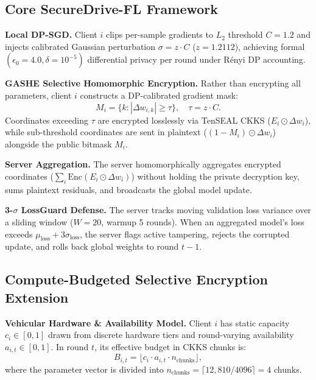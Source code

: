 \documentclass[acmtog,nonacm]{acmart}
\begin{document}
\subsection{Core SecureDrive-FL Framework}
\label{subsec:securedrive-fl}

\textbf{Local DP-SGD.} Client $i$ clips per-sample gradients to $L_2$ threshold $C = 1.2$ and injects calibrated Gaussian perturbation $\sigma = z \cdot C$ ($z = 1.2112$), achieving formal $(\epsilon_0 = 4.0, \delta = 10^{-5})$ differential privacy per round under Rényi DP accounting.

\textbf{GASHE Selective Homomorphic Encryption.} Rather than encrypting all parameters, client $i$ constructs a DP-calibrated gradient mask:
\begin{equation}
M_i = \{k : |\Delta w_{i,k}| \ge \tau\}, \quad \tau = z \cdot C.
\end{equation}
Coordinates exceeding $\tau$ are encrypted losslessly via TenSEAL CKKS ($E_i \odot \Delta w_i$), while sub-threshold coordinates are sent in plaintext ($(1 - M_i) \odot \Delta w_i$) alongside the public bitmask $M_i$.

\textbf{Server Aggregation.} The server homomorphically aggregates encrypted coordinates ($\sum_i \text{Enc}(E_i \odot \Delta w_i)$) without holding the private decryption key, sums plaintext residuals, and broadcasts the global model update.

\textbf{3-$\sigma$ LossGuard Defense.} The server tracks moving validation loss variance over a sliding window ($W = 20$, warmup 5 rounds). When an aggregated model's loss exceeds $\mu_{\text{loss}} + 3\sigma_{\text{loss}}$, the server flags active tampering, rejects the corrupted update, and rolls back global weights to round $t-1$.

\subsection{Compute-Budgeted Selective Encryption Extension}
\label{subsec:budget-extension}

\textbf{Vehicular Hardware \& Availability Model.} Client $i$ has static capacity $c_i \in [0, 1]$ drawn from discrete hardware tiers and round-varying availability $a_{i,t} \in [0, 1]$. In round $t$, its effective budget in CKKS chunks is:
\begin{equation}
B_{i,t} = \lfloor c_i \cdot a_{i,t} \cdot n_{\text{chunks}} \rfloor,
\end{equation}
where the parameter vector is divided into $n_{\text{chunks}} = \lceil 12{,}810 / 4096 \rceil = 4$ chunks.
\end{document}
